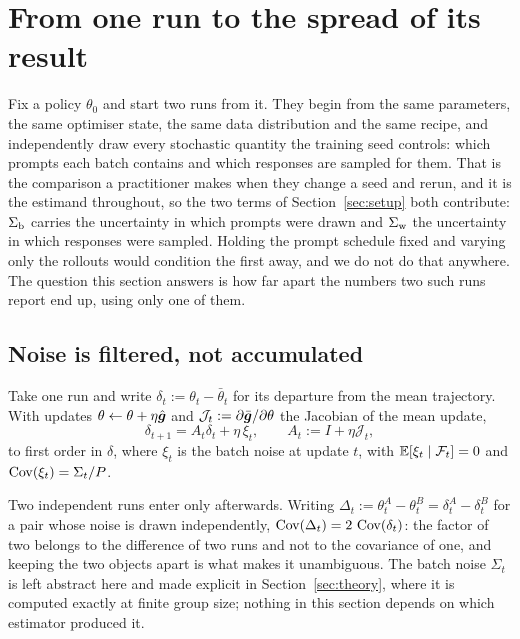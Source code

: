 \section{From one run to the spread of its result}
\label{sec:seeds}

Fix a policy $\theta_0$ and start two runs from it. They begin from the same parameters, the same
optimiser state, the same data distribution and the same recipe, and independently draw every
stochastic quantity the training seed controls: which prompts each batch contains and which
responses are sampled for them. That is the comparison a practitioner makes when they change a
seed and rerun, and it is the estimand throughout, so the two terms of
Section~\ref{sec:setup} both contribute: $\Sigma_{\mathrm{b}}$ carries the uncertainty in which prompts were
drawn and $\Sigma_{\mathrm{w}}$ the uncertainty in which responses were sampled. Holding the prompt schedule
fixed and varying only the rollouts would condition the first away, and we do not do that
anywhere. The question this section answers is how far apart the numbers two such runs report
end up, using only one of them.

\subsection{Noise is filtered, not accumulated}

Take one run and write $\delta_t := \theta_t - \bar\theta_t$ for its departure from the mean
trajectory. With updates $\theta \leftarrow \theta + \eta\hat{\bm{g}}$ and
$\mathcal{J}_t := \partial\bar{\bm{g}}/\partial\theta$ the Jacobian of the mean update,
\begin{equation}
  \label{eq:seed-recursion}
  \delta_{t+1} = A_t \delta_t + \eta\,\xi_t,
  \qquad A_t := I + \eta \mathcal{J}_t,
\end{equation}
to first order in $\delta$, where $\xi_t$ is the batch noise at update $t$, with
$\mathbb{E}[\xi_t \mid \mathcal{F}_t] = 0$ and $\operatorname{Cov}(\xi_t) = \Sigma_t/P$.

Two independent runs enter only afterwards. Writing $\Delta_t := \theta^A_t - \theta^B_t
= \delta^A_t - \delta^B_t$ for a pair whose noise is drawn independently,
$\operatorname{Cov}(\Delta_t) = 2\,\operatorname{Cov}(\delta_t)$: the factor of two belongs to the difference of two runs and
not to the covariance of one, and keeping the two objects apart is what makes it unambiguous.
The batch noise $\Sigma_t$ is left abstract here and made explicit in
Section~\ref{sec:theory}, where it is computed exactly at finite group size; nothing in this
section depends on which estimator produced it.

